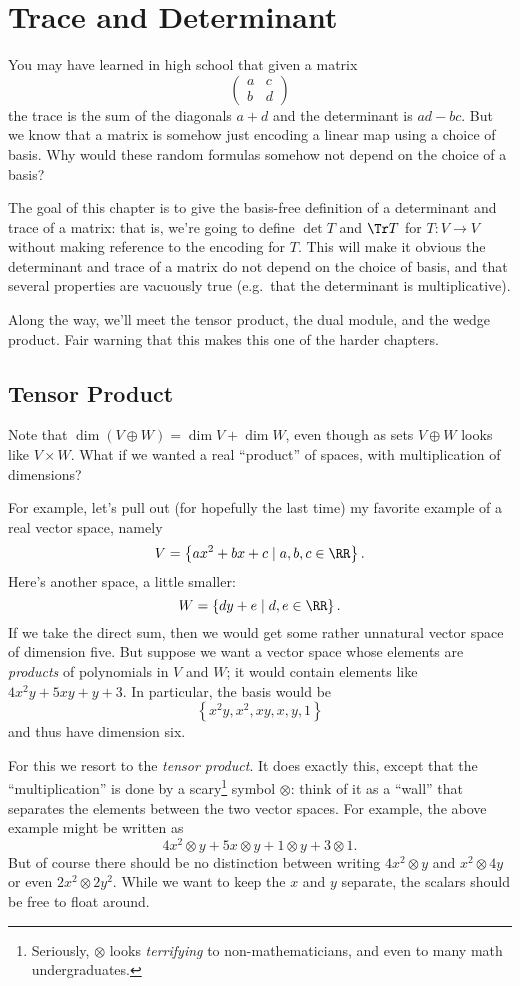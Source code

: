 \chapter{Trace and Determinant}
You may have learned in high school that given a matrix
\[ \left(
	\begin{array}{cc}
		a & c \\
		b & d
	\end{array}
	\right)
\]
the trace is the sum of the diagonals $a+d$ and the determinant is $ad-bc$.
But we know that a matrix is somehow just encoding a linear map using a choice of basis.
Why would these random formulas somehow not depend on the choice of a basis?

The goal of this chapter is to give the basis-free definition of a determinant and trace of a matrix: that is, we're going to define $\det T$ and $\Tr T$ for $T : V \to V$ without making reference to the encoding for $T$.
This will make it obvious the determinant and trace of a matrix do not depend on the choice of basis,
and that several properties are vacuously true (e.g.\ that the determinant is multiplicative).

Along the way, we'll meet the tensor product, the dual module, and the wedge product. Fair warning that this makes this one of the harder chapters.

\section{Tensor Product}
Note that $\dim (V \oplus W) = \dim V + \dim W$, even though as sets $V \oplus W$ looks like $V \times W$.
What if we wanted a real ``product'' of spaces,
with multiplication of dimensions?

For example, let's pull out (for hopefully the last time)
my favorite example of a real vector space, namely
\[ V = \left\{ ax^2 + bx + c \mid a,b,c \in \RR \right\}. \]
Here's another space, a little smaller:
\[ W = \left\{ dy + e \mid d,e \in \RR \right\}. \]
If we take the direct sum, then we would get some rather unnatural
vector space of dimension five.
But suppose we want a vector space
whose elements are \emph{products} of polynomials in $V$ and $W$;
it would contain elements like $4x^2y + 5xy + y + 3$.
In particular, the basis would be
\[ \left\{ x^2y, x^2, xy, x, y, 1 \right\} \]
and thus have dimension six.

For this we resort to the \emph{tensor product}.
It does exactly this, except that the ``multiplication''
is done by a scary\footnote{%
	Seriously, $\otimes$ looks \emph{terrifying} to non-mathematicians,
	and even to many math undergraduates.}
symbol $\otimes$:
think of it as a ``wall'' that separates the elements
between the two vector spaces.
For example, the above example might be written as
\[ 4x^2 \otimes y + 5x \otimes y + 1 \otimes y + 3 \otimes 1. \]
But of course there should be no distinction between writing $4x^2 \otimes y$ and $x^2 \otimes 4y$ or even $2x^2 \otimes 2y^2$.
While we want to keep the $x$ and $y$ separate,
the scalars should be free to float around.

